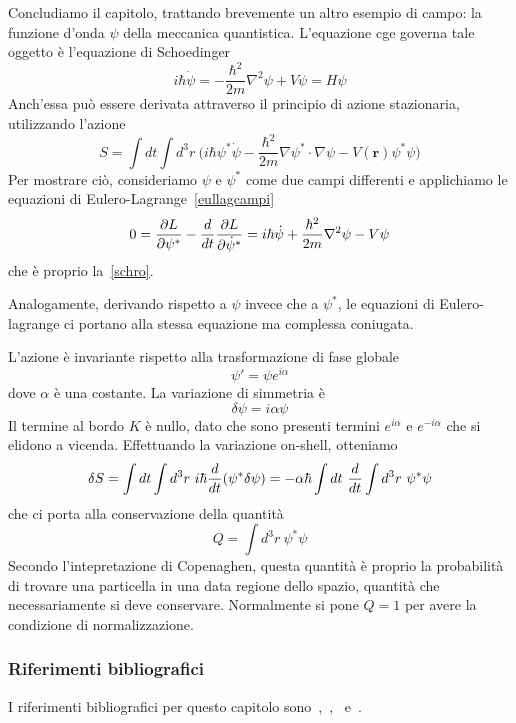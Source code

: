     Concludiamo il capitolo, trattando brevemente un altro esempio di campo: la funzione d'onda $\psi$ della meccanica quantistica. L'equazione cge governa tale oggetto è l'equazione di Schoedinger
    \begin{equation} \label{schro}
        i \hbar \dot \psi = - \frac{\hbar^2}{2m} \nabla^2 \psi + V \psi = H \psi
    \end{equation}
    Anch'essa può essere derivata attraverso il principio di azione stazionaria, utilizzando l'azione 
    \begin{equation*}
        S = \int dt \int d^3 r ~ \Big( i \hbar \psi^* \dot \psi - \frac{\hbar^2}{2m} \nabla \psi^* \cdot \nabla \psi - V(\mathbf r) \psi^* \psi \Big)
    \end{equation*}
    Per mostrare ciò, consideriamo $\psi$ e $\psi^*$ come due campi differenti e applichiamo le equazioni di Eulero-Lagrange~\eqref{eullagcampi}
    \begin{equation*}
        0 = \frac{\partial L}{\partial\psi^*} - \frac{d}{dt} \frac{\partial L}{\partial\dot \psi^*} = i \hbar \dot \psi + \frac{\hbar^2}{2m} \nabla^2 \psi - V \psi 
    \end{equation*}
    che è proprio la~\eqref{schro}.

    Analogamente, derivando rispetto a $\psi$ invece che a $\psi^*$, le equazioni di Eulero-lagrange ci portano alla stessa equazione ma complessa coniugata. 

    \hfill

    L'azione è invariante rispetto alla trasformazione di fase globale 
\begin{equation*}
    \psi' = \psi e^{i\alpha}
\end{equation*}
    dove $\alpha$ è una costante. La variazione di simmetria è 
\begin{equation*}
    \delta \psi = i \alpha \psi
\end{equation*}
    Il termine al bordo $K$ è nullo, dato che sono presenti termini $e^{i\alpha}$ e $e^{-i\alpha}$ che si elidono a vicenda. Effettuando la variazione on-shell, otteniamo 
\begin{equation*}
    \delta S = \int dt \int d^3 r ~ i \hbar \frac{d}{dt} (\psi^* \delta \psi) = - \alpha \hbar \int dt ~ \frac{d}{dt} \int d^3 r ~ \psi^* \psi
\end{equation*}
    che ci porta alla conservazione della quantità
\begin{equation*}
    Q = \int d^3 r ~ \psi^* \psi
\end{equation*}
    Secondo l'intepretazione di Copenaghen, questa quantità è proprio la probabilità di trovare una particella in una data regione dello spazio, quantità che necessariamente si deve conservare. Normalmente si pone $Q = 1$ per avere la condizione di normalizzazione. 

\subsubsection{Riferimenti bibliografici}
    I riferimenti bibliografici per questo capitolo sono~\cite{landaucampi},~\cite{barone},~\cite{banados} e~\cite{weinberg}.
